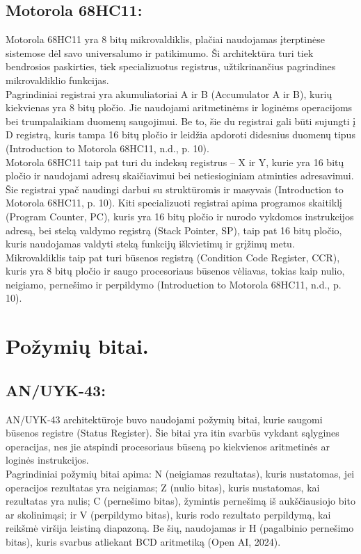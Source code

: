 \documentclass[a4paper,12pt]{article}
\begin{document}
\subsection{Motorola 68HC11:}
Motorola 68HC11 yra 8 bitų mikrovaldiklis, plačiai naudojamas įterptinėse sistemose dėl savo universalumo ir patikimumo. Ši architektūra turi tiek bendrosios paskirties, tiek specializuotus registrus, užtikrinančius pagrindines mikrovaldiklio funkcijas.\\
Pagrindiniai registrai yra akumuliatoriai A ir B (Accumulator A ir B), kurių kiekvienas yra 8 bitų pločio. Jie naudojami aritmetinėms ir loginėms operacijoms bei trumpalaikiam duomenų saugojimui. Be to, šie du registrai gali būti sujungti į D registrą, kuris tampa 16 bitų pločio ir leidžia apdoroti didesnius duomenų tipus (Introduction to Motorola 68HC11, n.d., p. 10).\\
Motorola 68HC11 taip pat turi du indeksų registrus – X ir Y, kurie yra 16 bitų pločio ir naudojami adresų skaičiavimui bei netiesioginiam atminties adresavimui. Šie registrai ypač naudingi darbui su struktūromis ir masyvais (Introduction to Motorola 68HC11, p. 10).
Kiti specializuoti registrai apima programos skaitiklį (Program Counter, PC), kuris yra 16 bitų pločio ir nurodo vykdomos instrukcijos adresą, bei steką valdymo registrą (Stack Pointer, SP), taip pat 16 bitų pločio, kuris naudojamas valdyti steką funkcijų iškvietimų ir grįžimų metu. Mikrovaldiklis taip pat turi būsenos registrą (Condition Code Register, CCR), kuris yra 8 bitų pločio ir saugo procesoriaus būsenos vėliavas, tokias kaip nulio, neigiamo, pernešimo ir perpildymo (Introduction to Motorola 68HC11, n.d., p. 10).

\section{Požymių bitai.}
\subsection{AN/UYK-43:}
AN/UYK-43 architektūroje buvo naudojami požymių bitai, kurie saugomi būsenos registre (Status Register). Šie bitai yra itin svarbūs vykdant sąlygines operacijas, nes jie atspindi procesoriaus būseną po kiekvienos aritmetinės ar loginės instrukcijos.\\
Pagrindiniai požymių bitai apima: N (neigiamas rezultatas), kuris nustatomas, jei operacijos rezultatas yra neigiamas; Z (nulio bitas), kuris nustatomas, kai rezultatas yra nulis; C (pernešimo bitas), žymintis pernešimą iš aukščiausiojo bito ar skolinimąsi; ir V (perpildymo bitas), kuris rodo rezultato perpildymą, kai reikšmė viršija leistiną diapazoną. Be šių, naudojamas ir H (pagalbinio pernešimo bitas), kuris svarbus atliekant BCD aritmetiką (Open AI, 2024).
\end{document}

